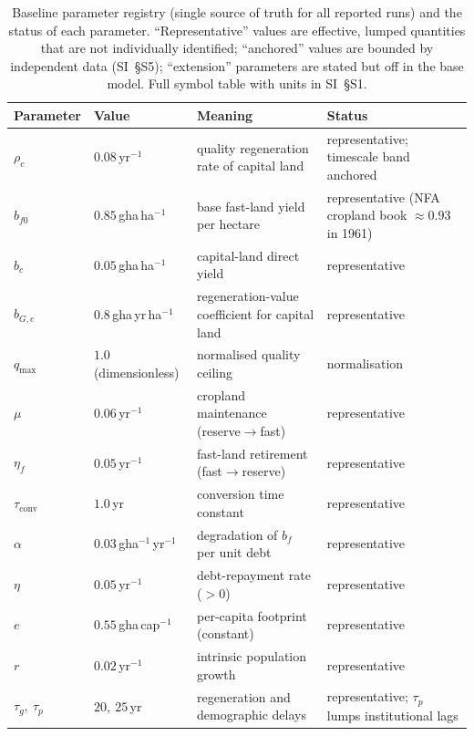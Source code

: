 \documentclass[preprint,12pt,authoryear]{elsarticle}
\newcommand{\tconv}{\tau_{\mathrm{conv}}}
\begin{document}
\begin{table}[!htbp]
\centering\footnotesize
\caption{Baseline parameter registry (single source of truth for all reported runs) and the status of each parameter. ``Representative'' values are effective, lumped quantities that are not individually identified; ``anchored'' values are bounded by independent data (SI~\S S5); ``extension'' parameters are stated but off in the base model. Full symbol table with units in SI~\S S1.}
\label{tab:params}
\setlength{\tabcolsep}{4pt}
\begin{tabularx}{\textwidth}{@{}>{\raggedright\arraybackslash}p{} >{\raggedright\arraybackslash}p{} >{\raggedright\arraybackslash}X >{\raggedright\arraybackslash}p{}@{}}
\toprule
Parameter & Value & Meaning & Status \\
\midrule
$\rho_c$ & $0.08$\,yr$^{-1}$ & quality regeneration rate of capital land & representative; timescale band anchored \\
$b_{f0}$ & $0.85$\,gha\,ha$^{-1}$ & base fast-land yield per hectare & representative (NFA cropland book $\approx0.93$ in 1961) \\
$b_c$ & $0.05$\,gha\,ha$^{-1}$ & capital-land direct yield & representative \\
$b_{G,c}$ & $0.8$\,gha\,yr\,ha$^{-1}$ & regeneration-value coefficient for capital land & representative \\
$q_{\max}$ & $1.0$ (dimensionless) & normalised quality ceiling & normalisation \\
$\mu$ & $0.06$\,yr$^{-1}$ & cropland maintenance (reserve$\to$fast) & representative \\
$\eta_f$ & $0.05$\,yr$^{-1}$ & fast-land retirement (fast$\to$reserve) & representative \\
$\tconv$ & $1.0$\,yr & conversion time constant & representative \\
$\alpha$ & $0.03$\,gha$^{-1}$\,yr$^{-1}$ & degradation of $b_f$ per unit debt & representative \\
$\eta$ & $0.05$\,yr$^{-1}$ & debt-repayment rate ($>0$) & representative \\
$e$ & $0.55$\,gha\,cap$^{-1}$ & per-capita footprint (constant) & representative \\
$r$ & $0.02$\,yr$^{-1}$ & intrinsic population growth & representative \\
$\tau_g,\ \tau_p$ & $20,\ 25$\,yr & regeneration and demographic delays & representative; $\tau_p$ lumps institutional lags \\

\end{tabularx}
\end{table}
\end{document}
